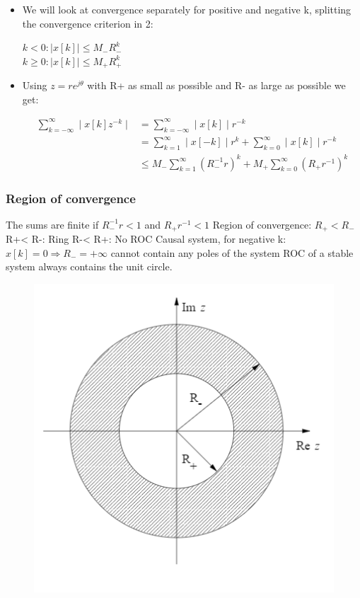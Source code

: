 \begin{frame}
		\begin{itemize}
			\item We will look at convergence separately for positive and negative k, splitting the convergence criterion in 2:
			\begin{center}
				$k<0: \mid x[k] \mid \leq M_{-}R_{-}^{k}$\\
				$k\geq 0: \mid x[k] \mid \leq M_{+}R_{+}^{k} $
			\end{center}
			\item Using $z = r e^{j\theta}$ with R+ as small as possible and R- as large as possible we get:
			\vspace{-2em}
			\begin{center}
				\begin{align*}
				\sum\limits_{k=-\infty}^{\infty} \mid x[k]z^{-k} \mid &= \sum\limits_{k=-\infty}^{\infty} \mid x[k] \mid r^{-k} \\
				&= \sum\limits_{k=1}^{\infty} \mid x[-k] \mid r^{k} + \sum\limits_{k=0}^{\infty} \mid x[k] \mid r^{-k} \\
				&\leq M_{-} \sum\limits_{k=1}^{\infty} (R_{-}^{-1}r)^{k} + M_{+} \sum\limits_{k= 0}^{\infty}(R_{+}r^{-1})^{k}
				\end{align*}
			\end{center}
		\end{itemize}
\end{frame}
\begin{frame}
\frametitle{Region of convergence}
The sums are finite if $R_{-}^{-1}r < 1$ and $R_{+}r^{-1} < 1$
Region of convergence: $R_{+} < R_{-}$
R+< R-: Ring
R-< R+: No ROC
Causal system, for negative k:
$x[k] = 0 \Rightarrow R_{-} = + \infty$
cannot contain any poles of the system
ROC of a stable system always contains
the unit circle.
\begin{figure}
\centering
\includegraphics[height=0.5\textheight]{Images/discrete_time_systems_24}
\label{fig:discrete_time_systems_24}
\end{figure}

\end{frame}
